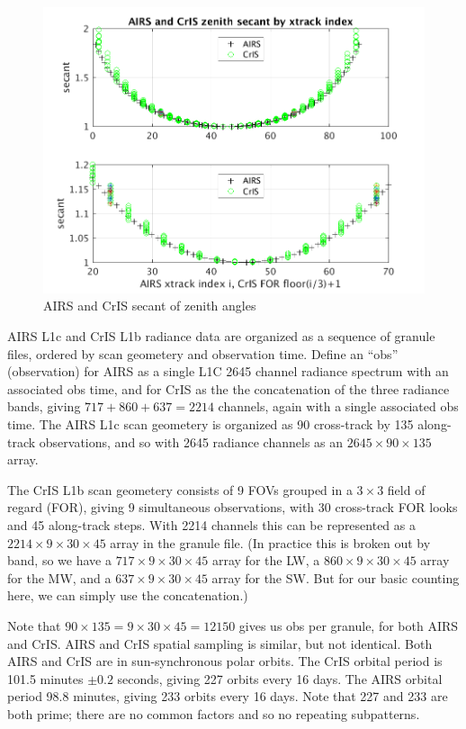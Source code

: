 \documentclass[12pt]{article}
\begin{document}
\begin{figure} %
\centering
\includegraphics[width=\textwidth]{figures/AIRS_CrIS_secant_by_xtrack.png}
\caption{AIRS and CrIS secant of zenith angles}
\label{figF}
\end{figure}

AIRS L1c and CrIS L1b radiance data are organized as a sequence of
granule files, ordered by scan geometery and observation time.
Define an ``obs'' (observation) for AIRS as a single L1C 2645
channel radiance spectrum with an associated obs time, and for CrIS
as the the concatenation of the three radiance bands, giving $717 +
860 + 637 = 2214$ channels, again with a single associated obs time.
The AIRS L1c scan geometery is organized as 90 cross-track by 135
along-track observations, and so with 2645 radiance channels as an
$2645 \times 90 \times 135$ array.

The CrIS L1b scan geometery consists of 9 FOVs grouped in a $3
\times 3$ field of regard (FOR), giving 9 simultaneous observations,
with 30 cross-track FOR looks and 45 along-track steps.  With 2214
channels this can be represented as a $2214 \times 9 \times 30
\times 45$ array in the granule file.  (In practice this is broken
out by band, so we have a $717 \times 9 \times 30 \times 45$ array
for the LW, a $860 \times 9 \times 30 \times 45$ array for the MW,
and a $637 \times 9 \times 30 \times 45$ array for the SW.  But for
our basic counting here, we can simply use the concatenation.)

Note that $90 \times 135 = 9 \times 30 \times 45 = 12150$ gives us
obs per granule, for both AIRS and CrIS.  AIRS and CrIS spatial
sampling is similar, but not identical.  Both AIRS and CrIS are in
sun-synchronous polar orbits.  The CrIS orbital period is 101.5
minutes $\pm 0.2$ seconds, giving 227 orbits every 16 days.  The
AIRS orbital period 98.8 minutes, giving 233 orbits every 16 days.
Note that 227 and 233 are both prime; there are no common factors
and so no repeating subpatterns.
\end{document}
